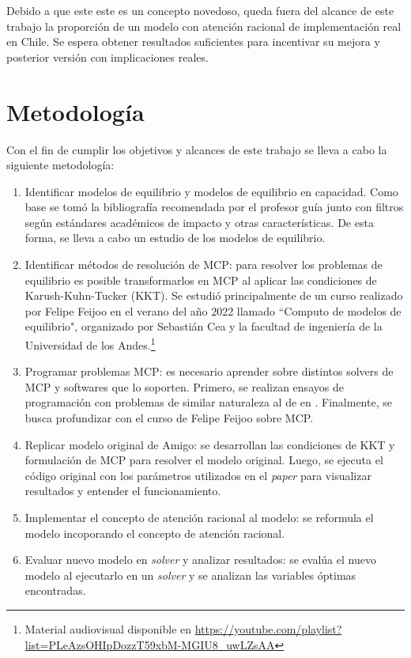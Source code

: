 Debido a que este este es un concepto novedoso, queda fuera del alcance de este trabajo la proporción de un modelo con atención racional de implementación real en Chile. Se espera obtener resultados suficientes para incentivar su mejora y posterior versión con implicaciones reales.

\section{Metodología}
Con el fin de cumplir los objetivos y alcances de este trabajo se lleva a cabo la siguiente metodología:

\begin{enumerate}
\item Identificar modelos de equilibrio y modelos de equilibrio en capacidad. Como base se tomó la bibliografía recomendada por el profesor guía junto con filtros según estándares académicos de impacto y otras características. De esta forma, se lleva a cabo un estudio de los modelos de equilibrio.

\item Identificar métodos de resolución de MCP: para resolver los problemas de equilibrio es posible transformarlos en MCP al aplicar las condiciones de Karush-Kuhn-Tucker (KKT). Se estudió principalmente de un curso realizado por Felipe Feijoo en el verano del año 2022 llamado ``Computo de modelos de equilibrio", organizado por Sebastián Cea y la facultad de ingeniería de la Universidad de los Andes.\footnote{Material audiovisual disponible en \url{https://youtube.com/playlist?list=PLeAzsOHIpDozzT59xbM-MGIU8_uwLZsAA}}   

\item Programar problemas MCP: es necesario aprender sobre distintos solvers de MCP y softwares que lo soporten. Primero, se realizan ensayos de programación con problemas de similar naturaleza al de  en . Finalmente, se busca profundizar con el curso de Felipe Feijoo sobre MCP. 

\item Replicar modelo original de Amigo: se desarrollan las condiciones de KKT y formulación de MCP para resolver el modelo original. Luego, se ejecuta el código original con los parámetros utilizados en el \textit{paper} para visualizar resultados y entender el funcionamiento.

\item Implementar el concepto de atención racional al modelo: se reformula el modelo incoporando el concepto de atención racional.

\item Evaluar nuevo modelo en \textit{solver} y analizar resultados: se evalúa el nuevo modelo al ejecutarlo en un \textit{solver} y se analizan las variables óptimas encontradas.
\end{enumerate}

